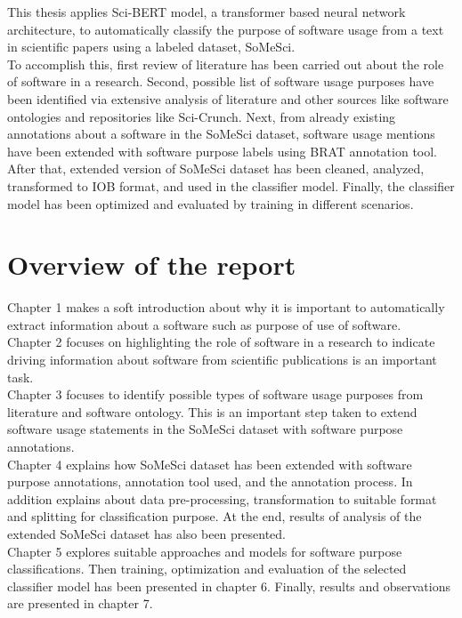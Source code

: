 This thesis applies \ac{Sci-BERT} model, a  transformer based neural network architecture, to automatically classify the purpose of software usage from a text in scientific papers using a labeled dataset, \ac{SoMeSci}. \\

To accomplish this, first review of literature has been carried out about the role of software in a research. Second, possible list of software usage purposes have been identified via extensive analysis of literature and other sources like software ontologies and repositories like Sci-Crunch. Next, from already existing annotations about a software in the \ac{SoMeSci} dataset, software usage mentions have been extended with software purpose labels using  BRAT annotation tool. After that, extended version of \ac{SoMeSci} dataset has been cleaned, analyzed, transformed to \ac{IOB} format, and used in the classifier model. Finally, the classifier model has been optimized and evaluated by training in different scenarios. 


%
%
\section{ Overview of the report }
\label{sec:intro:Overview}
\noindent Chapter 1 makes a soft introduction about why it is important to automatically extract information about a software such as purpose of use of software.  \\

\noindent Chapter 2 focuses on highlighting the role of software in a research to indicate driving information about software from scientific publications is an important task.  \\

\noindent Chapter 3 focuses to identify possible types of software usage purposes from literature and software ontology. This is an important step taken to extend software usage statements in the \ac{SoMeSci} dataset with software purpose annotations.  \\

\noindent Chapter 4  explains how \ac{SoMeSci} dataset has been extended with software purpose annotations, annotation tool used, and the annotation process. In addition explains about data pre-processing, transformation to suitable format and splitting for classification purpose. At the end, results of analysis of the extended SoMeSci dataset has also been presented.  \\


\noindent Chapter 5 explores suitable approaches and models for software purpose classifications.  Then training, optimization and evaluation of the selected classifier model has been presented in chapter 6. Finally, results and observations are presented in chapter 7.  \\



